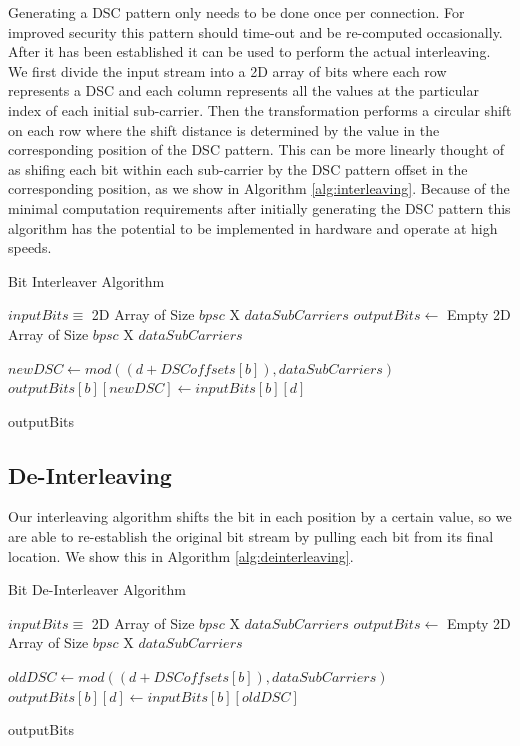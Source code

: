\documentclass[sigconf]{acmart}
\begin{document}
Generating a DSC pattern only needs to be done once per connection. For improved security this pattern should time-out and be re-computed occasionally. After it has been established it can be used to perform the actual interleaving. We first divide the input stream into a 2D array of bits where each row represents a DSC and each column represents all the values at the particular index of each initial sub-carrier. Then the transformation performs a circular shift on each row where the shift distance is determined by the value in the corresponding position of the DSC pattern. This can be more linearly thought of as shifing each bit within each sub-carrier by the DSC pattern offset in the corresponding position, as we show in Algorithm \ref{alg:interleaving}. Because of the minimal computation requirements after initially generating the DSC pattern this algorithm has the potential to be implemented in hardware and operate at high speeds.

\begin{algorithm}[ht]
\caption{Bit Interleaver Algorithm}
\label{alg:interleaving}
\begin{algorithmic}

\REQUIRE $inputBits \equiv$ 2D Array of Size $bpsc$ X $dataSubCarriers$
\STATE $outputBits \leftarrow $ Empty 2D Array of Size $bpsc$ X $dataSubCarriers$
\STATE

        \STATE $newDSC \leftarrow mod((d + DSCoffsets[b]), dataSubCarriers)$
        \STATE $outputBits[b][newDSC] \leftarrow inputBits[b][d]$
    \ENDFOR
\ENDFOR
\STATE

\RETURN outputBits 
\end{algorithmic}
\end{algorithm}



\subsection{De-Interleaving}
\label{sub:deinterleave}

Our interleaving algorithm shifts the bit in each position by a certain value, so we are able to re-establish the original bit stream by pulling each bit from its final location. We show this in Algorithm \ref{alg:deinterleaving}.

\begin{algorithm}[ht]
\caption{Bit De-Interleaver Algorithm}
\label{alg:deinterleaving}
\begin{algorithmic}

\REQUIRE $inputBits \equiv$ 2D Array of Size $bpsc$ X $dataSubCarriers$
\STATE $outputBits \leftarrow $ Empty 2D Array of Size $bpsc$ X $dataSubCarriers$
\STATE

        \STATE $oldDSC \leftarrow mod((d + DSCoffsets[b]), dataSubCarriers)$
        \STATE $outputBits[b][d] \leftarrow inputBits[b][oldDSC]$
    \ENDFOR
\ENDFOR
\STATE

\RETURN outputBits 
\end{algorithmic}
\end{algorithm}
\end{document}
